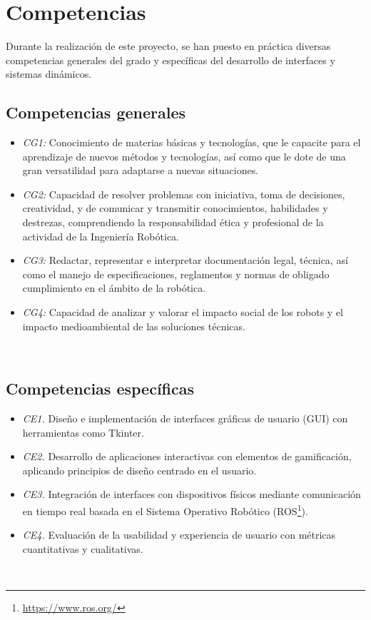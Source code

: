 \section{Competencias}
\label{sec:competencias}

Durante la realización de este proyecto, se han puesto en práctica diversas competencias generales del grado y específicas del desarrollo de interfaces y sistemas dinámicos.

\subsection{Competencias generales}
\label{sec:competencias}

\begin{itemize}
    \item \textit{CG1:} Conocimiento de materias básicas y tecnologías, que le capacite para el aprendizaje de nuevos métodos y tecnologías, así como que le dote de una gran versatilidad para adaptarse a nuevas situaciones.
    \item \textit{CG2:} Capacidad de resolver problemas con iniciativa, toma de decisiones, creatividad, y de comunicar y transmitir conocimientos, habilidades y destrezas, comprendiendo la responsabilidad ética y profesional de la actividad de la Ingeniería Robótica.
    \item \textit{CG3:} Redactar, representar e interpretar documentación legal, técnica, así como el manejo de especificaciones, reglamentos y normas de obligado cumplimiento en el ámbito de la robótica.
    \item \textit{CG4:} Capacidad de analizar y valorar el impacto social de los robots y el impacto medioambiental de las soluciones técnicas.
\end{itemize}\

\subsection{Competencias específicas}
\label{sec:competencias}

\begin{itemize}
    \item \textit{CE1.} Diseño e implementación de interfaces gráficas de usuario (GUI) con herramientas como Tkinter.
    \item \textit{CE2.} Desarrollo de aplicaciones interactivas con elementos de gamificación, aplicando principios de diseño centrado en el usuario.
    \item \textit{CE3.} Integración de interfaces con dispositivos físicos mediante comunicación en tiempo real basada en el Sistema Operativo Robótico (ROS\footnote{\url{https://www.ros.org/}}).
    \item \textit{CE4.} Evaluación de la usabilidad y experiencia de usuario con métricas cuantitativas y cualitativas.
\end{itemize}\

